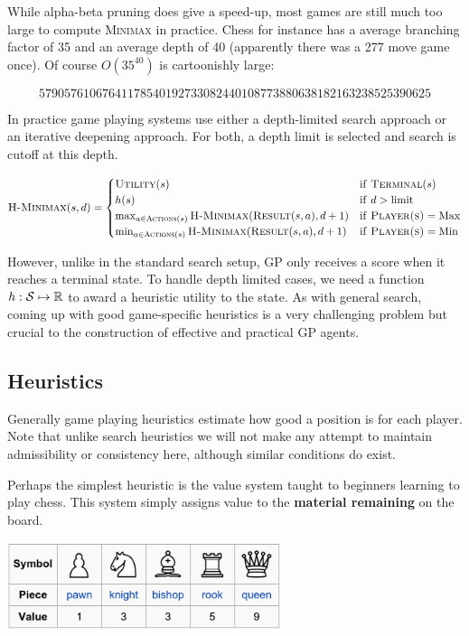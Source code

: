 \documentclass[11pt]{article}
\begin{document}
While alpha-beta pruning does give a speed-up, most games are still much too large to compute \textsc{Minimax} in practice. Chess for instance has a average branching factor of 35 and an average depth of 40 (apparently there was a 277 move game once). Of course $O(35^{40})$ is cartoonishly large:

\[ 57905761067641178540192733082440108773880638182163238525390625\] 

In practice game playing systems use either a depth-limited search approach or an iterative deepening approach. For both, a depth limit is selected and search is cutoff at this depth. 

\[ \mathrm{\textsc{H-Minimax}}(s, d) = \begin{cases} 
  \mathrm{\textsc{Utility}}(s) & \mathrm{if\ } \mathrm{\textsc{Terminal}}(s)  \\
  h(s) & \mathrm{if\ } d > \mathrm{limit}   \\
  \max_{a \in \mathrm{\textsc{Actions}}(s) } \mathrm{\textsc{H-Minimax}}(\mathrm{\textsc{Result}}(s, a), d+1) & \mathrm{if\ } \mathrm{\textsc{Player(s)}} = \mathrm{Max}  \\
  \min_{a \in \mathrm{\textsc{Actions}}(s) } \mathrm{\textsc{H-Minimax}}(\mathrm{\textsc{Result}}(s, a), d+1) & \mathrm{if\ } \mathrm{\textsc{Player(s)}} = \mathrm{Min} \end{cases}\] 

However, unlike in the standard search setup, GP only receives a score when it reaches a terminal state. To handle depth limited cases, we need a function $h: \mathcal{S} \mapsto \mathbb{R}$ to award a heuristic utility to the state. As with general search, coming up with good game-specific heuristics is a very challenging problem but crucial to the construction of effective and practical GP agents.  

\subsection{Heuristics}

Generally game playing heuristics estimate how good a position is for each player. Note that unlike search heuristics we will not make any attempt to maintain admissibility or consistency here, although similar conditions do exist.

Perhaps the simplest heuristic is the value system taught to beginners learning to play chess. This system simply assigns value to the \textbf{material remaining} on the board. 
\air

\centerline{\includegraphics[width=8cm]{pics/chessvalues1}}
\air
\end{document}
